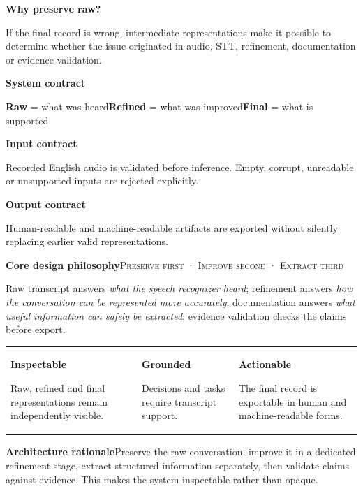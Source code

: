 \documentclass[9pt,a4paper]{extarticle}
\newcommand{\smallcaps}[1]{\textsc{#1}}
\newcommand{\twocard}[4]{%
\begin{minipage}[t]{0.48\textwidth}\begin{card}\textbf{#1}\par #2\end{card}\end{minipage}\hfill%
\begin{minipage}[t]{0.48\textwidth}\begin{card}\textbf{#3}\par #4\end{card}\end{minipage}}
\begin{document}
\vspace{3pt}
\twocard{Why preserve raw?}{If the final record is wrong, intermediate representations make it possible to determine whether the issue originated in audio, STT, refinement, documentation or evidence validation.}{System contract}{\small \textbf{Raw} = what was heard\quad \textbf{Refined} = what was improved\quad \textbf{Final} = what is supported.}

\vspace{4pt}
\twocard{Input contract}{Recorded English audio is validated before inference. Empty, corrupt, unreadable or unsupported inputs are rejected explicitly.}{Output contract}{\small Human-readable and machine-readable artifacts are exported without silently replacing earlier valid representations.}

\vspace{4pt}
\begin{darkcard}
\textbf{Core design philosophy}\hfill \smallcaps{Preserve first · Improve second · Extract third}\par
Raw transcript answers \textit{what the speech recognizer heard}; refinement answers \textit{how the conversation can be represented more accurately}; documentation answers \textit{what useful information can safely be extracted}; evidence validation checks the claims before export.
\end{darkcard}

\vspace{4pt}
\begin{tabularx}{\textwidth}{@{}XXX@{}}
\begin{card}\textbf{Inspectable}\par Raw, refined and final representations remain independently visible.
\end{card}&
\begin{card}\textbf{Grounded}\par Decisions and tasks require transcript support.
\end{card}&
\begin{card}\textbf{Actionable}\par The final record is exportable in human and machine-readable forms.
\end{card}
\end{tabularx}

\begin{card}\textbf{Architecture rationale}\quad Preserve the raw conversation, improve it in a dedicated refinement stage, extract structured information separately, then validate claims against evidence. This makes the system inspectable rather than opaque.\end{card}
\end{document}
